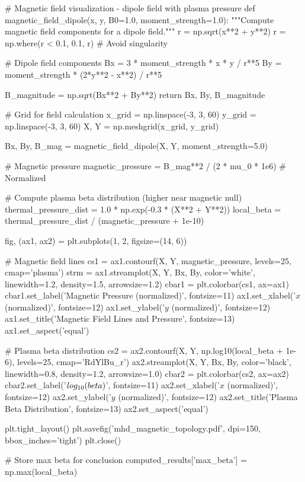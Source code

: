 \documentclass[11pt,a4paper]{article}
\begin{document}
\begin{pycode}
# Magnetic field visualization - dipole field with plasma pressure
def magnetic_field_dipole(x, y, B0=1.0, moment_strength=1.0):
    """Compute magnetic field components for a dipole field."""
    r = np.sqrt(x**2 + y**2)
    r = np.where(r < 0.1, 0.1, r)  # Avoid singularity

    # Dipole field components
    Bx = 3 * moment_strength * x * y / r**5
    By = moment_strength * (2*y**2 - x**2) / r**5

    B_magnitude = np.sqrt(Bx**2 + By**2)
    return Bx, By, B_magnitude

# Grid for field calculation
x_grid = np.linspace(-3, 3, 60)
y_grid = np.linspace(-3, 3, 60)
X, Y = np.meshgrid(x_grid, y_grid)

Bx, By, B_mag = magnetic_field_dipole(X, Y, moment_strength=5.0)

# Magnetic pressure
magnetic_pressure = B_mag**2 / (2 * mu_0 * 1e6)  # Normalized

# Compute plasma beta distribution (higher near magnetic null)
thermal_pressure_dist = 1.0 * np.exp(-0.3 * (X**2 + Y**2))
local_beta = thermal_pressure_dist / (magnetic_pressure + 1e-10)

fig, (ax1, ax2) = plt.subplots(1, 2, figsize=(14, 6))

# Magnetic field lines
cs1 = ax1.contourf(X, Y, magnetic_pressure, levels=25, cmap='plasma')
strm = ax1.streamplot(X, Y, Bx, By, color='white', linewidth=1.2,
                      density=1.5, arrowsize=1.2)
cbar1 = plt.colorbar(cs1, ax=ax1)
cbar1.set_label('Magnetic Pressure (normalized)', fontsize=11)
ax1.set_xlabel('$x$ (normalized)', fontsize=12)
ax1.set_ylabel('$y$ (normalized)', fontsize=12)
ax1.set_title('Magnetic Field Lines and Pressure', fontsize=13)
ax1.set_aspect('equal')

# Plasma beta distribution
cs2 = ax2.contourf(X, Y, np.log10(local_beta + 1e-6), levels=25, cmap='RdYlBu_r')
ax2.streamplot(X, Y, Bx, By, color='black', linewidth=0.8,
               density=1.2, arrowsize=1.0)
cbar2 = plt.colorbar(cs2, ax=ax2)
cbar2.set_label('$\\log_{10}(\\beta)$', fontsize=11)
ax2.set_xlabel('$x$ (normalized)', fontsize=12)
ax2.set_ylabel('$y$ (normalized)', fontsize=12)
ax2.set_title('Plasma Beta Distribution', fontsize=13)
ax2.set_aspect('equal')

plt.tight_layout()
plt.savefig('mhd_magnetic_topology.pdf', dpi=150, bbox_inches='tight')
plt.close()

# Store max beta for conclusion
computed_results['max_beta'] = np.max(local_beta)
\end{pycode}
\end{document}
